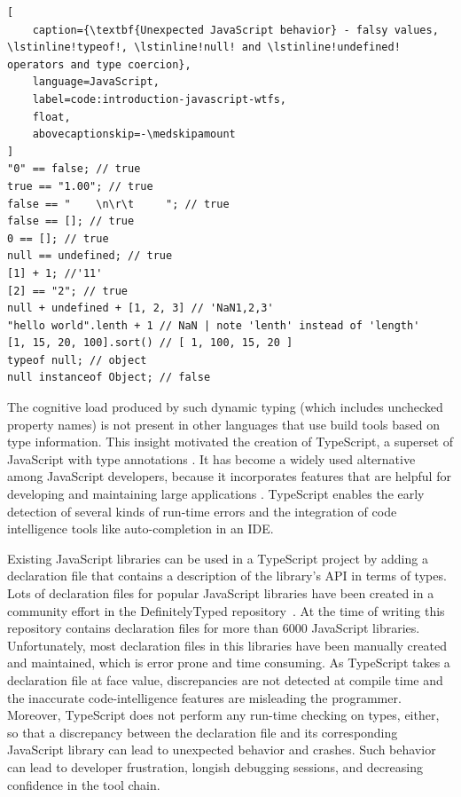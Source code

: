 \documentclass[a4paper,english,cleveref, autoref]{lipics-v2019}
\begin{document}
\begin{lstlisting}[
    caption={\textbf{Unexpected JavaScript behavior} - falsy values, \lstinline!typeof!, \lstinline!null! and \lstinline!undefined! operators and type coercion},
    language=JavaScript,
	label=code:introduction-javascript-wtfs,
    float,
    abovecaptionskip=-\medskipamount
]
"0" == false; // true
true == "1.00"; // true
false == "    \n\r\t     "; // true
false == []; // true
0 == []; // true
null == undefined; // true
[1] + 1; //'11'
[2] == "2"; // true
null + undefined + [1, 2, 3] // 'NaN1,2,3'
"hello world".lenth + 1 // NaN | note 'lenth' instead of 'length'
[1, 15, 20, 100].sort() // [ 1, 100, 15, 20 ]
typeof null; // object
null instanceof Object; // false
\end{lstlisting}

The cognitive load produced by such dynamic typing (which includes
unchecked property names) is not present in other languages that use
build tools based on type information. This insight motivated the
creation of TypeScript, a superset of JavaScript with type
annotations \cite{typescript}. It has become a widely used alternative
among JavaScript developers, because it incorporates features that are
helpful for developing and maintaining large applications
\cite{DBLP:conf/icse/GaoBB17}. TypeScript enables the early detection
of several kinds of run-time errors and the integration of code intelligence
tools like auto-completion in an IDE.

Existing JavaScript libraries can be used in a TypeScript project by
adding a declaration file that contains a description of the library's
API in terms of types. Lots of declaration files for popular
JavaScript libraries have been created in a community effort in the
DefinitelyTyped repository~\cite{definitely-typed-repository}.
At the time of writing this repository contains declaration files for
more than 6000 JavaScript libraries. Unfortunately, most declaration
files in this libraries have been manually created and maintained,
which is error prone and time consuming. As TypeScript takes a
declaration file at face value, discrepancies are not detected at
compile time and the inaccurate code-intelligence features are misleading the
programmer. Moreover, TypeScript does not perform any run-time 
checking on types, either, so that a discrepancy  between the declaration file
and its corresponding JavaScript library can lead to unexpected 
behavior and crashes. Such behavior can lead to developer
frustration, longish debugging sessions, and decreasing confidence in
the tool chain.
\end{document}
